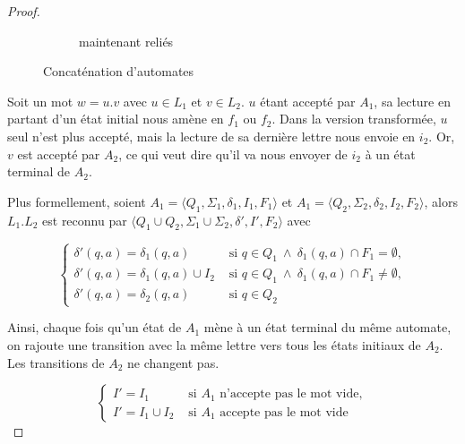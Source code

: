 \begin{proof}
\begin{figure*}[ht]
\begin{subfigure}[b]{0.5\textwidth}
\caption{maintenant reliés}
    \end{subfigure}
    \caption{Concaténation d'automates}
    \label{concatscheme}
\end{figure*}

\newpage

Soit un mot $w = u.v$ avec $u \in L_1$ et $v \in L_2$. $u$ étant accepté par $A_1$, sa lecture en partant d'un état initial nous amène en $f_1$ ou $f_2$. Dans la version transformée, $u$ seul n'est plus accepté, mais la lecture de sa dernière lettre nous envoie en $i_2$. Or, $v$ est accepté par $A_2$, ce qui veut dire qu'il va nous envoyer de $i_2$ à un état terminal de $A_2$.



Plus formellement, soient $A_1 = \big \langle Q_1, \Sigma_1, \delta_1, I_1, F_1\big \rangle$ et $A_1 = \big \langle Q_2, \Sigma_2, \delta_2, I_2, F_2\big \rangle$, alors $L_1.L_2$ est reconnu par $\big \langle Q_1 \cup Q_2, \Sigma_1 \cup \Sigma_2, \delta', I', F_2\big \rangle$ avec 

\[
\begin{cases}
\delta'(q,a) = \delta_1(q,a) &\text{ si } q \in Q_1 ~\wedge~\delta_1(q,a) \cap F_1 = \emptyset,\\[1ex]
\delta'(q,a) = \delta_1(q,a) \cup I_2 &\text{ si } q \in Q_1 ~\wedge~\delta_1(q,a) \cap F_1 \neq \emptyset,\\[1ex]
\delta'(q,a) = \delta_2(q,a) &\text{ si } q \in Q_2\end{cases}
\]

Ainsi, chaque fois qu'un état de $A_1$ mène à un état terminal du même automate, on rajoute une transition avec la même lettre vers tous les états initiaux de $A_2$. Les transitions de $A_2$ ne changent pas.

\[
\begin{cases}
I' = I_1 &\text{ si } A_1 \text{ n'accepte pas le mot vide},\\[1ex]
I' = I_1 \cup I_2&\text{ si } A_1 \text{ accepte pas le mot vide}
\end{cases}
\]


\end{proof}
